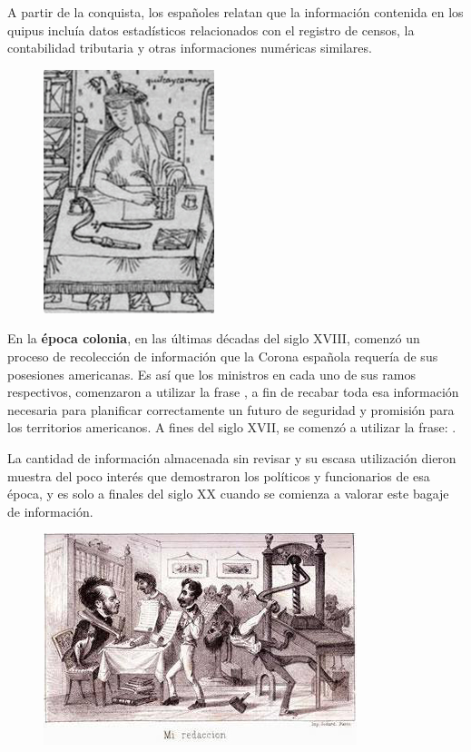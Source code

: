 \documentclass[a5paper,doc,10pt,noapacite]{apa6}
\begin{document}
{{A partir de la conquista, los españoles relatan que la información contenida en los quipus incluía datos estadísticos relacionados con el registro de censos, la contabilidad tributaria y otras informaciones numéricas similares. 

\begin{figure} %
    \centering
    \includegraphics[scale=0.35]{Graficos/fig3_GC.jpg}
    \vspace{-2em}
\end{figure}

En la \textbf{época colonia}, en las últimas décadas del siglo XVIII, comenzó un proceso de recolección de información que la Corona española requería de sus posesiones americanas. Es así que los ministros en cada uno de sus ramos respectivos, comenzaron a utilizar la frase , a fin de recabar toda esa información necesaria para planificar correctamente un futuro de seguridad y promisión para los territorios americanos. A fines del siglo XVII, se comenzó a utilizar la frase: .

\vspace{1\baselineskip}
La cantidad de información almacenada sin revisar y su escasa utilización dieron muestra del poco interés que demostraron los políticos y funcionarios de esa época, y es solo a finales del siglo XX cuando se comienza a valorar este bagaje de información.

\begin{figure} %
    \centering
    \includegraphics[scale=0.3]{Graficos/fig1_GC.jpg}
\end{figure}

}}
\end{document}
